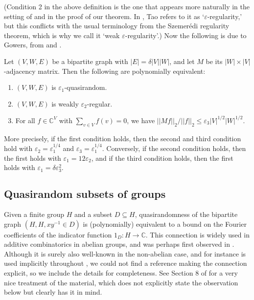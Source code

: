 \documentclass[10pt]{article}
\begin{document}
{(Condition 2 in the above definition is the one that appears more naturally in the setting of \cite{gowers_graphs} and in the proof of our theorem. In \cite{tao}, Tao refers to it as `$\varepsilon$-regularity,' but this conflicts with the usual terminology from the Szemerédi regularity theorem, which is why we call it `weak $\varepsilon$-regularity'.) Now the following is due to Gowers, from \cite{gowers_graphs} and \cite{gowers_groups}.

\begin{fact}\label{qr_thm}
    Let $(V,W,E)$ be a bipartite graph with $|E|=\delta|V||W|$, and let $M$ be its $|W|\times|V|$-adjacency matrix. Then the following are polynomially equivalent:
    \begin{enumerate}
        \item $(V,W,E)$ is $\varepsilon_1$-quasirandom.
        \item $(V,W,E)$ is weakly $\varepsilon_2$-regular.
        \item For all $f\in\mathbb{C}^V$ with $\sum_{v\in V}f(v)=0$, we have $||Mf||_2/||f||_2\leqslant\varepsilon_3|V|^{1/2}|W|^{1/2}$.
    \end{enumerate} More precisely, if the first condition holds, then the second and third condition hold with $\varepsilon_2=\varepsilon_1^{1/4}$ and $\varepsilon_3=\varepsilon_1^{1/4}$. Conversely, if the second condition holds, then the first holds with $\varepsilon_1=12\varepsilon_2$, and if the third condition holds, then the first holds with $\varepsilon_1=\delta\varepsilon_3^2$.
\end{fact}


\subsection{Quasirandom subsets of groups}\label{quasirandom subsets of groups section}
Given a finite group $H$ and a subset $D\subseteq H$, quasirandomness of the bipartite graph $(H,H,xy^{-1}\in D)$ is (polynomially) equivalent to a bound on the Fourier coefficients of the indicator function $1_D:H\to \mathbb{C}$. This connection is widely used in additive combinatorics in abelian groups, and was perhaps first observed in \cite{chung_graham}. Although it is surely also well-known in the non-abelian case, and for instance is used implicitly throughout \cite{gowers_groups}, we could not find a reference making the connection explicit, so we include the details for completeness. See Section 8 of \cite{breuillard} for a very nice treatment of the material, which does not explicitly state the observation below but clearly has it in mind.

}
\end{document}
